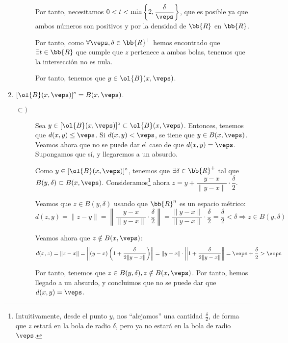 \begin{ejercicio}
\begin{enumerate}[label=\alph*)]
\begin{description}
            Por tanto, necesitamos $0<t<\min\left\{2,\dfrac{\delta}{\veps}\right\}$, que es posible ya que ambos números son positivos y por la densidad de $\bb{R}$ en $\bb{R}$.
            
            Por tanto, como $\forall \veps,\delta \in \bb{R}^+$ hemos encontrado que $\exists t\in \bb{R}$ que cumple que $z$ pertenece a ambas bolas, tenemos que la intersección no es nula.

            Por tanto, tenemos que $y\in \ol{B}(x,\veps)$.
        \end{description}
        
        \item $[\ol{B}(x,\veps)]^\circ = B(x,\veps)$.

        \begin{description}
            \item[$\subset)$] 
                Sea $y\in [\ol{B}(x,\veps)]^\circ\subset \ol{B}(x,\veps)$. Entonces, tenemos que $d(x,y)\leq \veps$. Si $d(x,y)<\veps$, se tiene que $y\in B(x,\veps)$. Veamos ahora que no se puede dar el caso de que $d(x,y)=\veps$. Supongamos que sí, y llegaremos a un absurdo.

                Como $y\in [\ol{B}(x,\veps)]^\circ$, tenemos que $\exists \delta\in \bb{R}^+$ tal que $B(y,\delta)\subset B(x,\veps)$. Consideramos\footnote{Intuitivamente, desde el punto $y$, nos ``alejamos'' una cantidad $\frac{\delta}{2}$, de forma que $z$ estará en la bola de radio $\delta$, pero ya no estará en la bola de radio $\veps$.} ahora $z=y+\dfrac{y-x}{\|y-x\|}\cdot \dfrac{\delta}{2}$.

                Veamos que $z\in B(y,\delta)$ usando que $\bb{R}^n$ es un espacio métrico:
                \begin{equation*}
                    d(z,y)=\|z-y\|=\left\|\dfrac{y-x}{\|y-x\|}\cdot \dfrac{\delta}{2}\right\| = \frac{\|y-x\|}{\|y-x\|}\cdot \frac{\delta}{2} = \frac{\delta}{2} < \delta  \Longrightarrow z\in B(y,\delta)
                \end{equation*}

                Veamos ahora que $z\notin B(x,\veps)$:
                \begin{equation*}
                    d(x,z)=\|z-x\|=\left\|(y-x)\left(1+\frac{\delta}{2\|y-x\|}\right)\right\| = \|y-x\|\cdot \left\|1+\frac{\delta}{2\|y-x\|}\right\| = \veps + \frac{\delta}{2}>\veps
                \end{equation*}

                Por tanto, tenemos que $z\in B(y,\delta), z\notin B(x,\veps)$. Por tanto, hemos llegado a un absurdo, y concluimos que no se puede dar que $d(x,y)=\veps$.
                

\end{description}
\end{enumerate}
\end{ejercicio}
